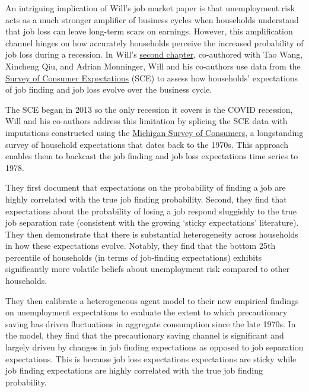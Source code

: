 \documentclass[\econtexRoot/Letter]{subfiles}
\begin{document}
\notinsubfile{\renewcommand{\econtexRoot}{.}}


An intriguing implication of Will's job market paper is that unemployment risk acts as a much stronger amplifier of business cycles when households understand that job loss can leave long-term scars on earnings. However, this amplification channel hinges on how accurately households perceive the increased probability of job loss during a recession. In Will's \href{https://acrobat.adobe.com/id/urn:aaid:sc:VA6C2:3adddfd2-1999-477d-b9f6-b8fbffbf4076}{second chapter}, co-authored with Tao Wang, Xincheng Qiu, and Adrian Monninger, Will and his co-authors use data from the \href{https://www.newyorkfed.org/microeconomics/sce#/}{Survey of Consumer Expectations} (SCE) to assess how households' expectations of job finding and job loss evolve over the business cycle.

The SCE began in 2013 so the only recession it covers is the COVID recession, Will and his co-authors address this limitation by splicing the SCE data with imputations constructed using the \href{https://data.sca.isr.umich.edu/}{Michigan Survey of Consumers}, a longstanding survey of household expectations that dates back to the 1970s. This approach enables them to backcast the job finding and job loss expectations time series to 1978. %

They first document that expectations on the probability of finding a job are highly correlated with the true job finding probability. Second, they find that expectations about the probability of losing a job respond sluggishly to the true job separation rate (consistent with the growing `sticky expectations' literature).
They then demonstrate that there is substantial heterogeneity across households in how these expectations evolve. Notably, they find that the bottom 25th percentile of households (in terms of job-finding expectations) exhibits significantly more volatile beliefs about unemployment risk compared to other households.

They then calibrate a heterogeneous agent model to their new empirical findings on unemployment expectations to evaluate the extent to which precautionary saving has driven fluctuations in aggregate consumption since the late 1970s. In the model, they find that the precautionary saving channel is significant and largely driven by changes in job finding expectations as opposed to job separation expectations. This is because job loss expectations expectations are sticky while job finding expectations are highly correlated with the true job finding probability. 



\onlyinsubfile{}

  \onlyinsubfile{\captionsetup[figure]{list=no}}
  \onlyinsubfile{\captionsetup[table]{list=no}}
\end{document}
